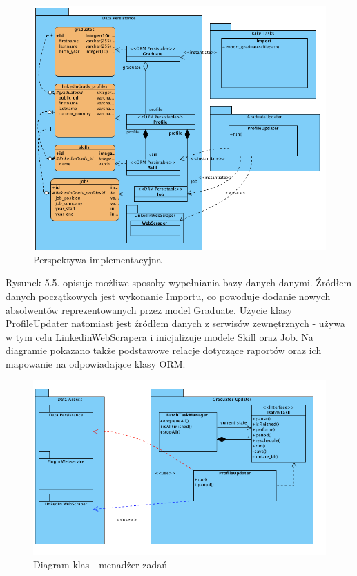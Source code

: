 \begin{figure}[H] 
\centering\includegraphics[width=15cm]{figures/image6}
\caption{Perspektywa implementacyjna}\label{rys:use-case-diagram}
\end{figure}

Rysunek 5.5. opisuje możliwe sposoby wypełniania bazy danych danymi. Źródłem danych początkowych jest wykonanie Importu, co powoduje dodanie nowych absolwentów reprezentowanych przez model Graduate. Użycie klasy ProfileUpdater natomiast jest źródłem danych z serwisów zewnętrznych - używa w tym celu LinkedinWebScrapera i inicjalizuje modele Skill oraz Job. Na diagramie pokazano także podstawowe relacje dotyczące raportów oraz ich mapowanie na odpowiadające klasy ORM.

\begin{figure}[H] 
\centering\includegraphics[width=15cm]{figures/image7}
\caption{Diagram klas - menadżer zadań}\label{rys:use-case-diagram}
\end{figure}

